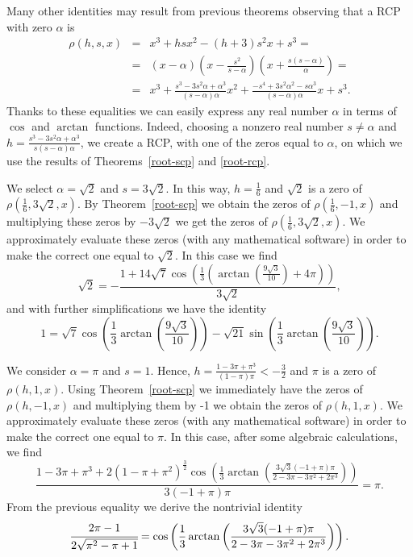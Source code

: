 \documentclass[12pt,reqno]{article}
\begin{document}
Many other identities may result from previous theorems observing that a RCP with zero $\alpha$ is
\begin{eqnarray} \label{rcp-extended}
\rho(h,s,x) &=& x^3+hsx^2-(h+3)s^2x+s^3 =\nonumber \\
 &=&(x-\alpha)\left(x-\frac{s^2}{s-\alpha }\right)\left(x+\frac{s (s-\alpha )}{\alpha }\right) =\nonumber\\ 
& =& x^3+\frac{s^3-3 s^2 \alpha+\alpha^3}{(s-\alpha) \alpha}x^2+\frac{-s^4+3 s^2 \alpha^2-s \alpha^3}{(s-\alpha) \alpha}x+s^3. \end{eqnarray}
Thanks to these equalities we can easily express any real number $\alpha$ in terms of $\cos$ and $\arctan$ functions. Indeed, choosing a nonzero real number $s\not=\alpha$ and $h=\frac{s^3-3s^2\alpha+\alpha^3}{s(s-\alpha)\alpha}$, we create a RCP,
with one of the zeros equal to $\alpha$, on which we use the results of 
Theorems~\ref{root-scp} and \ref{root-rcp}.
\begin{example}
We select $\alpha=\sqrt{2}$ and $s=3\sqrt{2}$. In this way, $h=\frac{1}{6}$ and $\sqrt{2}$ is a zero of $\rho(\frac{1}{6},3\sqrt{2},x)$. By Theorem~\ref{root-scp} we obtain the zeros of $\rho(\frac{1}{6},-1,x)$ and multiplying these zeros by $-3\sqrt{2}$ we get the zeros of $\rho(\frac{1}{6},3\sqrt{2},x)$. We approximately evaluate these zeros (with any mathematical software) 
in order to make the correct one equal to $\sqrt{2}$. In this case we find
$$\sqrt{2}=-\frac{1+14\sqrt{7}\cos\left(\frac{1}{3}\left(\arctan\left(\frac{9\sqrt{3}}{10}\right)+4\pi\right)\right)}{3\sqrt{2}},$$
and with further simplifications we have the identity
$$1=\sqrt{7}\cos\left(\frac{1}{3}\arctan\left(\frac{9\sqrt{3}}{10}\right)\right)-\sqrt{21}\sin\left(\frac{1}{3}\arctan\left(\frac{9\sqrt{3}}{10}\right)\right).$$
\end{example} 
\begin{example}
We consider $\alpha=\pi$ and $s=1$. Hence, $h=\frac{1-3\pi+\pi^3}{(1-\pi)\pi}<-\frac{3}{2}$ and $\pi$ is a zero of $\rho(h,1,x)$. Using Theorem~\ref{root-scp} we immediately have the zeros of $\rho(h,-1,x)$ and multiplying them by -1 we obtain the  zeros of $\rho(h,1,x)$. We approximately evaluate these zeros (with any mathematical software) in order to make the correct one equal to $\pi$.
In this case, after some algebraic calculations, we find
$$\frac{1-3 \pi +\pi ^3+2 \left(1-\pi +\pi ^2\right)^{\frac{3}{2}} \cos\left(\frac{1}{3} \arctan\left(\frac{3 \sqrt{3} (-1+\pi ) \pi }{2-3 \pi -3 \pi ^2+2 \pi ^3}\right)\right)}{3 (-1+\pi ) \pi }=\pi.$$
 From the previous equality  we derive  the nontrivial identity
$$\cfrac{2\pi-1}{2\sqrt{\pi^2-\pi+1}}=\cos\left(\frac{1}{3} \arctan\left(\frac{3 \sqrt{3} (-1+\pi ) \pi }{2-3 \pi -3 \pi ^2+2 \pi ^3}\right)\right).$$
\end{example} 
\end{document}
